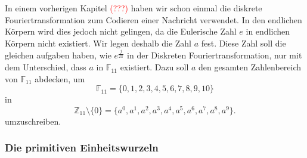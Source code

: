 In einem vorherigen Kapitel \textcolor{red}{(???)} haben wir schon einmal die diskrete Fouriertransformation zum Codieren einer Nachricht verwendet. In den endlichen Körpern wird dies jedoch nicht gelingen, da die Eulerische Zahl $e$ in endlichen Körpern nicht existiert.
Wir legen deshalb die Zahl $a$ fest. Diese Zahl soll die gleichen aufgaben haben, wie $e^{\frac{j}{2 \pi}}$ in der Diskreten Fouriertransformation, nur mit dem Unterschied, dass $a$ in $\mathbb{F}_{11}$ existiert. Dazu soll $a$ den gesamten Zahlenbereich von $\mathbb{F}_{11}$ abdecken, um
\[
\mathbb{F}_{11} = \{0,1,2,3,4,5,6,7,8,9,10\}
\]
in
\[
\mathbb{Z}_{11}\setminus\{0\} = \{a^0, a^1, a^2, a^3, a^4, a^5, a^6, a^7, a^8, a^9\}.
\]
umzuschreiben.
%

\subsubsection{Die primitiven Einheitswurzeln
	\label{reedsolomon:subsection:primsqrt}}


